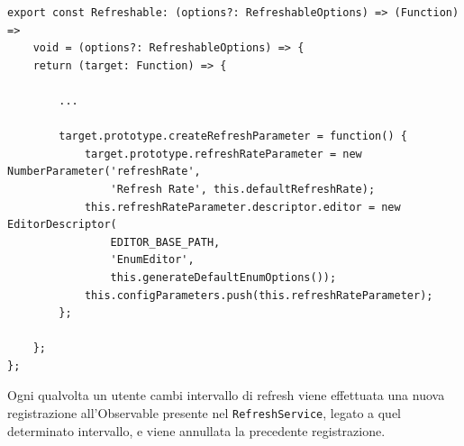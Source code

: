 \begin{lstlisting}[caption={Creazione del refreshRateParameter all'interno del Refreshable decorator}, style=javaScriptCode]
export const Refreshable: (options?: RefreshableOptions) => (Function) => 
    void = (options?: RefreshableOptions) => {
    return (target: Function) => {
        
        ...
        
        target.prototype.createRefreshParameter = function() {
            target.prototype.refreshRateParameter = new NumberParameter('refreshRate', 
                'Refresh Rate', this.defaultRefreshRate);
            this.refreshRateParameter.descriptor.editor = new EditorDescriptor(
                EDITOR_BASE_PATH,
                'EnumEditor',
                this.generateDefaultEnumOptions());
            this.configParameters.push(this.refreshRateParameter);
        };
        
    };
};
\end{lstlisting}
Ogni qualvolta un utente cambi intervallo di refresh viene effettuata una nuova registrazione all'Observable presente nel \verb|RefreshService|, legato a quel determinato intervallo, e viene annullata la precedente registrazione.\\

